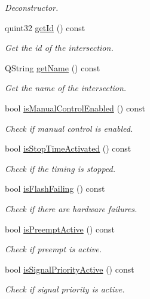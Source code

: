 \begin{DoxyCompactItemize}
\begin{DoxyCompactList}\small\item\em Deconstructor. \end{DoxyCompactList}\item 
quint32 \hyperlink{classV2XIntersection_a3567a94db4efeaccb53d9a244fb7d6b3}{get\+Id} () const 
\begin{DoxyCompactList}\small\item\em Get the id of the intersection. \end{DoxyCompactList}\item 
Q\+String \hyperlink{classV2XIntersection_ae1dfdb950312d7f64e8cd3d9bca2cc50}{get\+Name} () const 
\begin{DoxyCompactList}\small\item\em Get the name of the intersection. \end{DoxyCompactList}\item 
bool \hyperlink{classV2XIntersection_a9d042552f51b0aea06f90ec3d9fc65e4}{is\+Manual\+Control\+Enabled} () const 
\begin{DoxyCompactList}\small\item\em Check if manual control is enabled. \end{DoxyCompactList}\item 
bool \hyperlink{classV2XIntersection_a6b8fb171f0efd262f1d1a50669836823}{is\+Stop\+Time\+Activated} () const 
\begin{DoxyCompactList}\small\item\em Check if the timing is stopped. \end{DoxyCompactList}\item 
bool \hyperlink{classV2XIntersection_a769240fcceec0c1c13c60c07ac5ec279}{is\+Flash\+Failing} () const 
\begin{DoxyCompactList}\small\item\em Check if there are hardware failures. \end{DoxyCompactList}\item 
bool \hyperlink{classV2XIntersection_ae7aad466ea2c7da3159c51c6e9384a35}{is\+Preempt\+Active} () const 
\begin{DoxyCompactList}\small\item\em Check if preempt is active. \end{DoxyCompactList}\item 
bool \hyperlink{classV2XIntersection_af6e45bd8c5e160fec1b947c35d1f415d}{is\+Signal\+Priority\+Active} () const 
\begin{DoxyCompactList}\small\item\em Check if signal priority is active. \end{DoxyCompactList}\item 

\end{DoxyCompactItemize}
